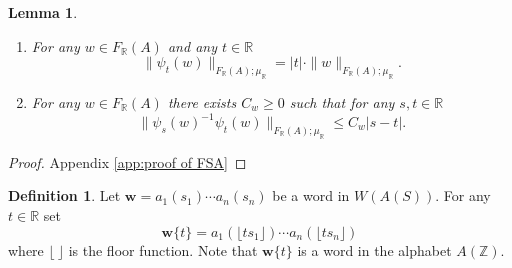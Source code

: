 \documentclass[12pt]{amsart}
\newtheorem{cor}[prop]{Corollary}
\newtheorem{lemma}[prop]{Lemma}
\theoremstyle{definition}
\newtheorem{defn}[prop]{Definition}
\def\RR{\ensuremath{\mathbb{R}}}
\def\ZZ{\ensuremath{\mathbb{Z}}}
\newcommand{\B}[1]{\mathbf{#1}}
\def\Free{F}
\begin{document}
\begin{lemma}\label{L:psit FRA properties}
\begin{enumerate}[label=(\alph*)]
\item
\label{L:psit FRA properties:multiplicative}
For any $w \in F_\RR(A)$ and any $t \in \RR$
\[
\|\psi_t(w)\|_{F_\RR(A);\mu_\RR} = |t| \cdot \|w\|_{F_\RR(A);\mu_\RR}.
\]

\item
\label{L:psit FRA properties:difference}
For any $w \in F_\RR(A)$ there exists $C_w \geq 0$ such that for any $s,t \in \RR$ 
\[
\| \psi_s(w)^{-1}\psi_t(w)\|_{F_\RR(A);\mu_\RR} \leq C_w |s-t|.
\]
\end{enumerate}
\end{lemma}


\begin{proof}
Appendix \ref{app:proof of FSA}
\end{proof}

\begin{defn}\label{def:w bracket}
Let $\B w=a_1(s_1) \cdots a_n(s_n)$ be a word in $W(A(S))$.
For any $t \in \RR$ set
\[
\B w\{t\} = a_1(\lfloor ts_1 \rfloor) \cdots a_n(\lfloor ts_n \rfloor)
\]
where $\lfloor \ \rfloor$ is the floor function.
Note that $\B w\{t\}$ is a word in the alphabet $A(\ZZ)$.
\end{defn}
\end{document}
